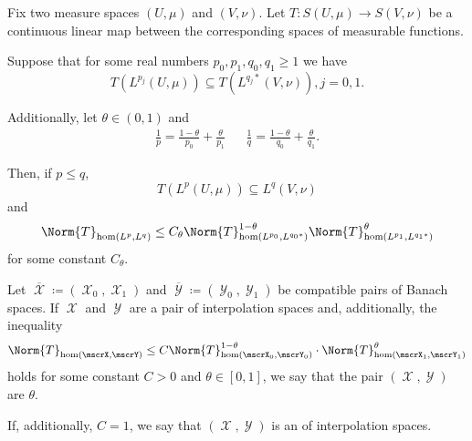 \begin{theorem}
  Fix two measure spaces \( (U, \mu) \) and \( (V, \nu) \). Let \( T: S(U, \mu) \to S(V, \nu) \) be a continuous linear map between the corresponding spaces of measurable functions.

  Suppose that for some real numbers \( p_0, p_1, q_0, q_1 \geq 1 \) we have
  \begin{equation*}
    T(L^{p_j}(U, \mu)) \subseteq T(L^{q_j *}(V, \nu)), j = 0, 1.
  \end{equation*}

  Additionally, let \( \theta \in (0, 1) \) and
  \begin{align*}
    \frac 1 p = \frac {1 - \theta} {p_0} + \frac {\theta} {p_1}
    &&
    \frac 1 q = \frac {1 - \theta} {q_0} + \frac {\theta} {q_1}.
  \end{align*}

  Then, if \( p \leq q \),
  \begin{equation*}
    T(L^p(U, \mu)) \subseteq L^q(V, \nu)
  \end{equation*}
  and
  \begin{equation*}
    \Norm{T}_{\Hom(L^p, L^q)} \leq C_\theta \Norm{T}_{\Hom(L^{p_0}, L^{q_0*})}^{1 - \theta} \Norm{T}_{\Hom(L^{p_1}, L^{q_1*})}^\theta
  \end{equation*}
  for some constant \( C_\theta \).
\end{theorem}

\begin{definition}\label{def:banach_interpolation_space_exponent}
  Let \( \overline{\mscrX} \coloneqq ( \mscrX_0, \mscrX_1 ) \) and \( \overline{\mscrY} \coloneqq ( \mscrY_0, \mscrY_1 ) \) be compatible pairs of Banach spaces. If \( \mscrX \) and \( \mscrY \) are a pair of interpolation spaces and, additionally, the inequality
  \begin{equation}\label{da:def:banach_interpolation_space_exponent}
    \Norm{T}_{\Hom(\mscrX, \mscrY)} \leq C \Norm{T}_{\Hom(\mscrX_0, \mscrY_0)}^{1-\theta} \cdot \Norm{T}_{\Hom(\mscrX_1, \mscrY_1)}^{\theta}
  \end{equation}
  holds for some constant \( C > 0 \) and \( \theta \in [0, 1] \), we say that the pair \( (\mscrX, \mscrY) \) are  \( \theta \).

  If, additionally, \( C = 1 \), we say that \( (\mscrX, \mscrY) \) is an  of interpolation spaces.
\end{definition}

